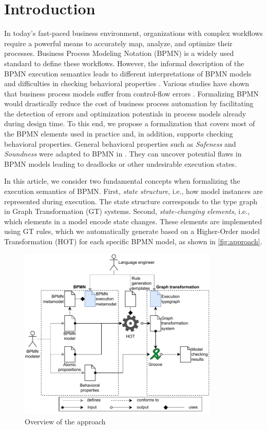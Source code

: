 \documentclass{lmcs} %
\begin{document}
\section{Introduction}
In today's fast-paced business environment, organizations with complex workflows require a powerful means to accurately map, analyze, and optimize their processes. 
Business Process Modeling Notation (BPMN) \cite{objectmanagementgroupBusinessProcessModel2013} is a widely used standard to define these workflows.
However, the informal description of the BPMN execution semantics leads to different interpretations of BPMN models and difficulties in checking behavioral properties \cite{corradiniFormalApproachAnalysis2021}.
Various studies have shown that business process models suffer from control-flow errors \cite{mendlingEmpiricalStudiesProcess2009}.
Formalizing BPMN would drastically reduce the cost of business process automation by facilitating the detection of errors and optimization potentials in process models already during design time.
To this end, we propose a formalization that covers most of the BPMN elements used in practice and, in addition, supports checking behavioral properties.
General behavioral properties such as \textit{Safeness} and \textit{Soundness} were adapted to BPMN in \cite{corradiniClassificationBPMNCollaborations2018}. They can uncover potential flaws in BPMN models leading to deadlocks or other undesirable execution states.

In this article, we consider two fundamental concepts when formalizing the execution semantics of BPMN.
First, \textit{state structure}, i.e., how model instances are represented during execution.
The state structure corresponds to the type graph in Graph Transformation (GT) systems.
Second, \textit{state-changing elements}, i.e., which elements in a model encode state changes.
These elements are implemented using GT rules, which we automatically generate based on a Higher-Order model Transformation (HOT) \cite{tisiUseHigherOrderModel2009} for each specific BPMN model, as shown in \autoref{fig:approach}.

\begin{figure}[ht]
    \centering
    \includegraphics[width=0.85\textwidth]{images/bpmn_semantics-overview.pdf}
    \caption{Overview of the approach}
    \label{fig:approach}
\end{figure}
\end{document}
